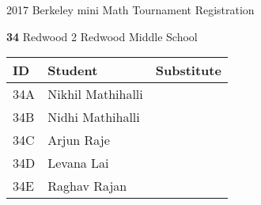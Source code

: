 \documentclass[12pt]{amsart}
\begin{document}
\newpage



\renewcommand{\TeamID}{34}
\renewcommand{\TeamName}{Redwood 2}
\renewcommand{\SchoolName}{Redwood Middle School}
\renewcommand{\IDA}{34A}
\renewcommand{\IDB}{34B}
\renewcommand{\IDC}{34C}
\renewcommand{\IDD}{34D}
\renewcommand{\IDE}{34E}
\renewcommand{\StudentA}{Nikhil Mathihalli}
\renewcommand{\StudentB}{Nidhi Mathihalli}
\renewcommand{\StudentC}{Arjun Raje}
\renewcommand{\StudentD}{Levana Lai}
\renewcommand{\StudentE}{Raghav Rajan}

\begin{center}
{\sc \Large 2017 Berkeley mini Math Tournament Registration}

\bigskip
\bigskip

{\bf \Large  \TeamID} \hfill {\large \TeamName} \hfill {\large \SchoolName}

\bigskip
\bigskip

\begin{tabular}{| p{} | p{} | p{} |}
\hline
\bf ID         & \bf Student             & \bf Substitute             \\ \hline
\IDA           & \StudentA               &                            \\ \hline
\IDB           & \StudentB               &                            \\ \hline
\IDC           & \StudentC               &                            \\ \hline
\IDD           & \StudentD               &                            \\ \hline
\IDE           & \StudentE               &                            \\ \hline
\end{tabular} 
\end{center}
\bigskip
\bigskip

\newpage



\renewcommand{\TeamID}{35}
\renewcommand{\TeamName}{SJMC Prime Thinkers}
\renewcommand{\SchoolName}{San Jose Math Circle}
\renewcommand{\IDA}{35A}
\renewcommand{\IDB}{35B}
\renewcommand{\IDC}{35C}
\renewcommand{\IDD}{35D}
\renewcommand{\IDE}{}
\renewcommand{\StudentA}{Arhan Mulay}
\renewcommand{\StudentB}{Paurush Pandey}
\renewcommand{\StudentC}{Linus Tang}
\renewcommand{\StudentD}{Alex Wang}
\renewcommand{\StudentE}{}
\end{document}
